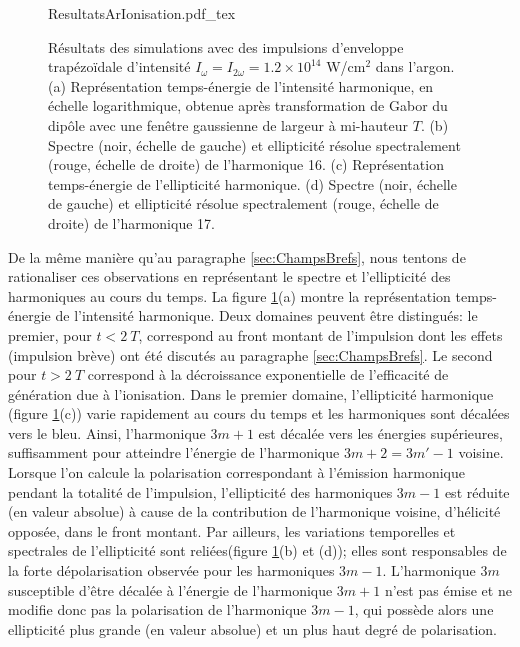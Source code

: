 \begin{figure}
\centering
\def\svgwidth{\textwidth}
{ResultatsArIonisation.pdf_tex}
\caption{Résultats des simulations avec des impulsions d'enveloppe trapézoïdale d'intensité $I_\omega = I_{2\omega} = 1.2 \times 10^{14}$ W/cm$^2$ dans l'argon. (a) Représentation temps-énergie de l'intensité harmonique, en échelle logarithmique, obtenue après transformation de Gabor du dipôle avec une fenêtre gaussienne de largeur à mi-hauteur $T$. (b) Spectre (noir, échelle de gauche) et ellipticité résolue spectralement (rouge, échelle de droite) de l'harmonique 16. (c) Représentation temps-énergie de l'ellipticité harmonique. (d) Spectre (noir, échelle de gauche) et ellipticité résolue spectralement (rouge, échelle de droite) de l'harmonique 17.}
\label{fig:ResultatsArIonisation}
\end{figure}

De la même manière qu'au paragraphe \ref{sec:ChampsBrefs}, nous tentons de rationaliser ces observations en représentant le spectre et l'ellipticité des harmoniques au cours du temps. La figure \ref{fig:ResultatsArIonisation}(a) montre la représentation temps-énergie de l'intensité harmonique. Deux domaines peuvent être distingués: le premier, pour $t < 2\: T$, correspond au front montant de l'impulsion dont les effets (impulsion brève) ont été discutés au paragraphe \ref{sec:ChampsBrefs}. Le second pour $t > 2 \: T$ correspond à la décroissance exponentielle de l'efficacité de génération due à l'ionisation. Dans le premier domaine, l'ellipticité harmonique (figure \ref{fig:ResultatsArIonisation}(c)) varie rapidement au cours du temps et les harmoniques sont décalées vers le bleu. Ainsi, l'harmonique $3m+1$ est décalée vers les énergies supérieures, suffisamment pour atteindre l'énergie de l'harmonique $3m+2 = 3m'-1$ voisine. Lorsque l'on calcule la polarisation correspondant à l'émission harmonique pendant la totalité de l'impulsion, l'ellipticité des harmoniques $3m-1$ est réduite (en valeur absolue) à cause de la contribution de l'harmonique voisine, d'hélicité opposée, dans le front montant. Par ailleurs, les variations temporelles et spectrales de l'ellipticité sont reliées(figure \ref{fig:ResultatsArIonisation}(b) et (d)); elles sont responsables de la forte dépolarisation observée pour les harmoniques $3m-1$. L'harmonique $3m$ susceptible d'être décalée à l'énergie de l'harmonique $3m+1$ n'est pas émise et ne modifie donc pas la polarisation de l'harmonique $3m-1$, qui possède alors une ellipticité plus grande (en valeur absolue) et un plus haut degré de polarisation. 

